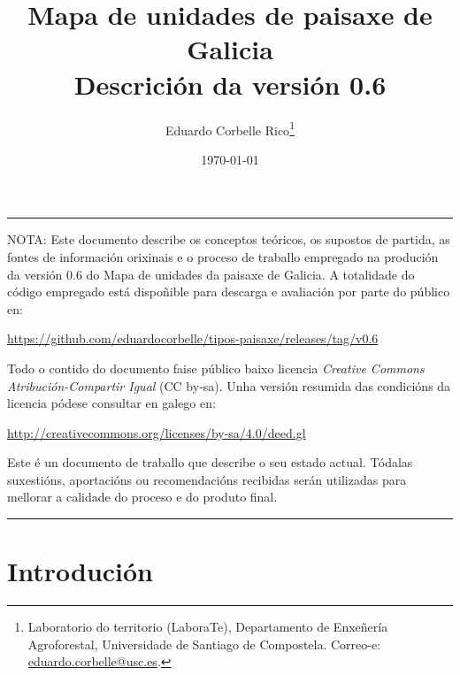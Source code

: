 \documentclass[11pt,a4paper]{article}
\title{Mapa de unidades de paisaxe de Galicia\\Descrición da versión 0.6}
\author{Eduardo Corbelle Rico\thanks{Laboratorio do territorio (LaboraTe), Departamento de Enxeñería Agroforestal, Universidade de Santiago de Compostela. Correo-e: \href{mailto:eduardo.corbelle@usc.es}{eduardo.corbelle@usc.es}.}}
\date{\today}
\begin{document}
\maketitle

\hrule
 \vspace{.2cm}
  \begin{small}
   \noindent NOTA: Este documento describe os conceptos teóricos, os supostos de partida, as fontes de información orixinais e o proceso de traballo empregado na produción da versión 0.6 do Mapa de unidades da paisaxe de Galicia. A totalidade do código empregado está dispoñible para descarga e avaliación por parte do público en:
   \begin{center}
 \url{https://github.com/eduardocorbelle/tipos-paisaxe/releases/tag/v0.6}   
   \end{center}
Todo o contido do documento faise público baixo licencia \emph{Creative Commons Atribución-Compartir Igual} (CC by-sa). Unha versión resumida das condicións da licencia pódese consultar en galego en:
   \begin{center}
 \url{http://creativecommons.org/licenses/by-sa/4.0/deed.gl}
   \end{center}
Este é un documento de traballo que describe o seu estado actual. Tódalas suxestións, aportacións ou recomendacións recibidas serán utilizadas para mellorar a calidade do proceso e do produto final.
  \end{small}
 \vspace{.2cm}
\hrule
\bigskip


\section{Introdución}
\end{document}
